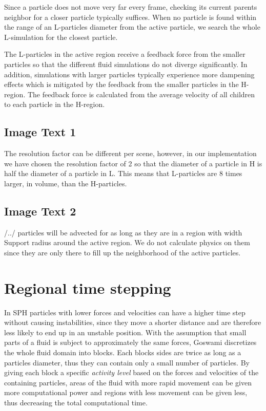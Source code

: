 \documentclass[../../main.tex]{subfiles}
\begin{document}
Since a particle does not move very far every frame, checking its current parents neighbor for a closer particle typically suffices. When no particle is found within the range of an L-particles diameter from the active particle, we search the whole L-simulation for the closest particle. 

The L-particles in the active region receive a feedback force from the smaller particles so that the different fluid simulations do not diverge significantly. In addition, simulations with larger particles typically experience more dampening effects which is mitigated by the feedback from the smaller particles in the H-region. The feedback force is calculated from the average velocity of all children to each particle in the H-region. 

\subsection{Image Text 1}
The resolution factor can be different per scene, however, in our implementation we have chosen the resolution factor of 2 so that the diameter of a particle in H is half the diameter of a particle in L. This means that L-particles are 8 times larger, in volume, than the H-particles.

\subsection{Image Text 2}
/../ particles will be advected for as long as they are in a region with width Support radius around the active region. We do not calculate physics on them since they are only there to fill up the neighborhood of the active particles.

\section{Regional time stepping}
In SPH particles with lower forces and velocities can have a higher time step without causing instabilities, since they move a shorter distance and are therefore less likely to end up in an unstable position. With the assumption that small parts of a fluid is subject to approximately the same forces, Goswami discretizes the whole fluid domain into blocks. Each blocks sides are twice as long as a particles diameter, thus they can contain only a small number of particles. By giving each block a specific \textit{activity level} based on the forces and velocities of the containing particles, areas of the fluid with more rapid movement can be given more computational power and regions with less movement can be given less, thus decreasing the total computational time. 
\end{document}
